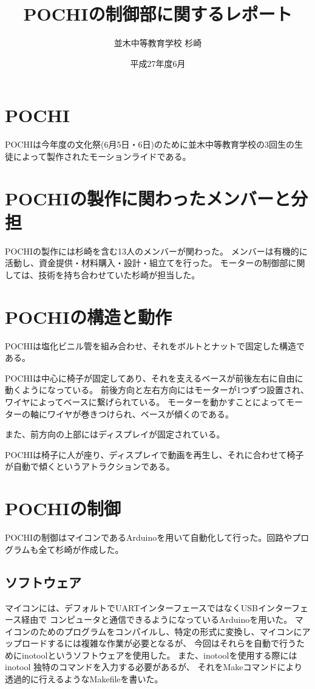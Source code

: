 \documentclass{jsarticle}
\title{POCHIの制御部に関するレポート}
\author{並木中等教育学校 杉崎}
\date{平成27年度6月}
\begin{document}
\maketitle

\section{POCHI}
POCHIは今年度の文化祭(6月5日・6日)のために並木中等教育学校の3回生の生徒によって製作されたモーションライドである。

\section{POCHIの製作に関わったメンバーと分担}
POCHIの製作には杉崎を含む13人のメンバーが関わった。
メンバーは有機的に活動し、資金提供・材料購入・設計・組立てを行った。
モーターの制御部に関しては、技術を持ち合わせていた杉崎が担当した。

\section{POCHIの構造と動作}
POCHIは塩化ビニル管を組み合わせ、それをボルトとナットで固定した構造である。

POCHIは中心に椅子が固定してあり、それを支えるベースが前後左右に自由に動くようになっている。
前後方向と左右方向にはモーターが1つずつ設置され、ワイヤによってベースに繋げられている。
モーターを動かすことによってモーターの軸にワイヤが巻きつけられ、ベースが傾くのである。

また、前方向の上部にはディスプレイが固定されている。

POCHIは椅子に人が座り、ディスプレイで動画を再生し、それに合わせて椅子が自動で傾くというアトラクションである。

\section{POCHIの制御}
POCHIの制御はマイコンであるArduinoを用いて自動化して行った。回路やプログラムも全て杉崎が作成した。

\subsection{ソフトウェア}
マイコンには、デフォルトでUARTインターフェースではなくUSBインターフェース経由で
コンピュータと通信できるようになっているArduinoを用いた。
マイコンのためのプログラムをコンパイルし、特定の形式に変換し、マイコンにアップロードするには複雑な作業が必要となるが、
今回はそれらを自動で行うためにinotoolというソフトウェアを使用した。
また、inotoolを使用する際にはinotool 独特のコマンドを入力する必要があるが、
それをMakeコマンドにより透過的に行えるようなMakefileを書いた。
\end{document}
